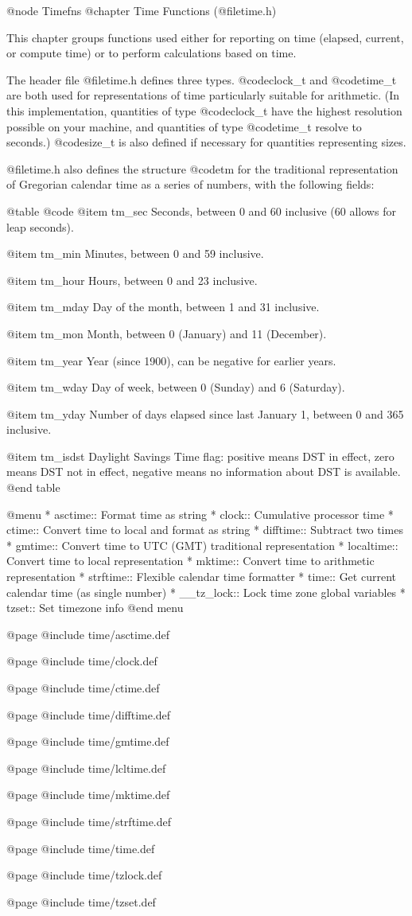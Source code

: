 @node Timefns
@chapter Time Functions (@file{time.h})

This chapter groups functions used either for reporting on time
(elapsed, current, or compute time) or to perform calculations based
on time.

The header file @file{time.h} defines three types.  @code{clock_t} and
@code{time_t} are both used for representations of time particularly
suitable for arithmetic.  (In this implementation, quantities of type
@code{clock_t} have the highest resolution possible on your machine,
and quantities of type @code{time_t} resolve to seconds.)  @code{size_t}
is also defined if necessary for quantities representing sizes. 

@file{time.h} also defines the structure @code{tm} for the traditional
representation of Gregorian calendar time as a series of numbers, with
the following fields: 

@table @code
@item tm_sec
Seconds, between 0 and 60 inclusive (60 allows for leap seconds).

@item tm_min
Minutes, between 0 and 59 inclusive.

@item tm_hour
Hours, between 0 and 23 inclusive.

@item tm_mday
Day of the month, between 1 and 31 inclusive.

@item tm_mon
Month, between 0 (January) and 11 (December).

@item tm_year
Year (since 1900), can be negative for earlier years.

@item tm_wday
Day of week, between 0 (Sunday) and 6 (Saturday).

@item tm_yday
Number of days elapsed since last January 1, between 0 and 365 inclusive.

@item tm_isdst
Daylight Savings Time flag: positive means DST in effect, zero means DST
not in effect, negative means no information about DST is available.
@end table

@menu
* asctime::     Format time as string
* clock::       Cumulative processor time
* ctime::       Convert time to local and format as string
* difftime::    Subtract two times
* gmtime::      Convert time to UTC (GMT) traditional representation
* localtime::   Convert time to local representation
* mktime::      Convert time to arithmetic representation
* strftime::    Flexible calendar time formatter
* time::        Get current calendar time (as single number)
* __tz_lock::   Lock time zone global variables
* tzset::       Set timezone info
@end menu

@page
@include time/asctime.def

@page
@include time/clock.def

@page
@include time/ctime.def

@page
@include time/difftime.def

@page
@include time/gmtime.def

@page
@include time/lcltime.def

@page
@include time/mktime.def

@page
@include time/strftime.def

@page
@include time/time.def

@page
@include time/tzlock.def

@page
@include time/tzset.def
